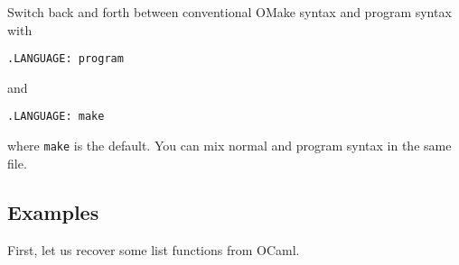 Switch back and forth between conventional OMake syntax and program
syntax with

\begin{verbatim}
.LANGUAGE: program
\end{verbatim}

and

\begin{verbatim}
.LANGUAGE: make
\end{verbatim}

where \verb+make+ is the default.  You can mix normal and program
syntax in the same file.


\subsection{Examples}

First, let us recover some list functions from OCaml.

